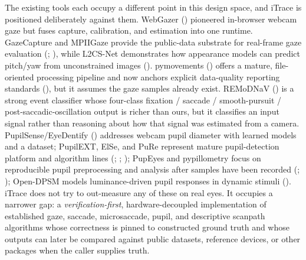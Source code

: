 \documentclass[
]{article}
\begin{document}
The existing tools each occupy a different point in this design space,
and iTrace is positioned deliberately against them. WebGazer
()
pioneered in-browser webcam gaze but fuses capture, calibration, and
estimation into one runtime. GazeCapture and MPIIGaze provide the
public-data substrate for real-frame gaze evaluation
(;
), while L2CS-Net
demonstrates how appearance models can predict pitch/yaw from
unconstrained images (). pymovements () offers a mature, file-oriented processing pipeline and now
anchors explicit data-quality reporting standards
(),
but it assumes the gaze samples already exist. REMoDNaV
() is a
strong event classifier whose four-class fixation / saccade /
smooth-pursuit / post-saccadic-oscillation output is richer than ours,
but it classifies an input signal rather than reasoning about how that
signal was estimated from a camera. PupilSense/EyeDentify
() addresses webcam
pupil diameter with learned models and a dataset; PupilEXT, ElSe, and
PuRe represent mature pupil-detection platform and algorithm lines
(;
;
);
PupEyes and pypillometry focus on reproducible pupil preprocessing and
analysis after samples have been recorded
(;
); Open-DPSM models
luminance-driven pupil responses in dynamic stimuli
(). iTrace does not try
to out-measure any of these on real eyes. It occupies a narrower gap: a
\emph{verification-first}, hardware-decoupled implementation of
established gaze, saccade, microsaccade, pupil, and descriptive scanpath
algorithms whose correctness is pinned to constructed ground truth and
whose outputs can later be compared against public datasets, reference
devices, or other packages when the caller supplies truth.
\end{document}
